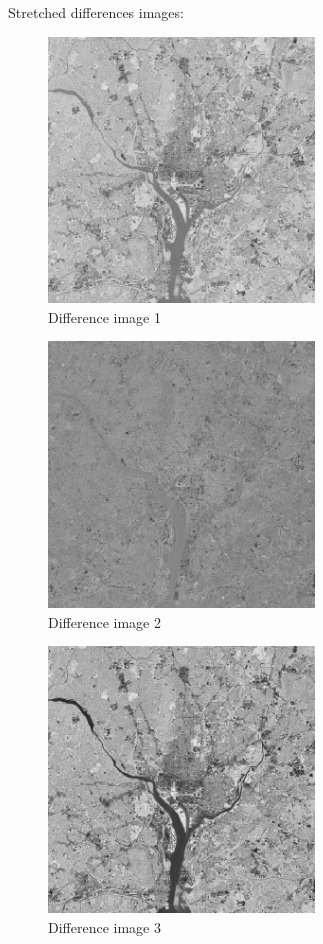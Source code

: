 \documentclass[10pt]{article}
\begin{document}
\clearpage
Stretched differences images:
\begin{figure}[!ht]
	\centering
	\includegraphics[height=200pt]{./ex10/Wash1diff.jpg}
	\caption{Difference image 1}
\end{figure}
\begin{figure}[!ht]
	\centering
	\includegraphics[height=200pt]{./ex10/Wash2diff.jpg}
	\caption{Difference image 2}
\end{figure}
\begin{figure}[!ht]
	\centering
	\includegraphics[height=200pt]{./ex10/Wash3diff.jpg}
	\caption{Difference image 3}
\end{figure}
\end{document}
